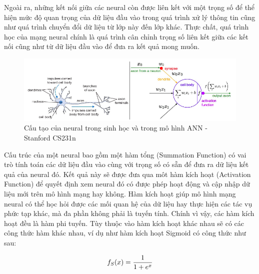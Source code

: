 Ngoài ra, những kết nối giữa các neural còn được liên kết với một trọng số để thể hiện mức độ quan trọng của dữ liệu đầu vào trong quá trình xử lý thông tin cũng như quá trình chuyển đổi dữ liệu từ lớp này đến lớp khác. Thực chất, quá trình học của mạng neural chính là quá trình cân chỉnh trọng số liên kết giữa các kết nối cũng như từ dữ liệu đầu vào để đưa ra kết quả mong muốn.

\begin{figure}[htbp]
    \centering
    \includegraphics[width=13cm]{Images/neural.png}
    \caption[Cấu tạo của neural trong sinh học và trong mô hình ANN]
    {Cấu tạo của neural trong sinh học và trong mô hình ANN - Stanford CS231n}
\end{figure}

Cấu trúc của một neural bao gồm một hàm tổng (Summation Function) có vai trò tính toán các dữ liệu đầu vào cùng với trọng số có sẵn để đưa ra dữ liệu kết quả của neural đó. Kết quả này sẽ được đưa qua môt hàm kích hoạt (Activation Function) để quyết định xem neural đó có được phép hoạt động và cập nhập dữ liệu mới trên mô hình mạng hay không. Hàm kích hoạt giúp mô hình mạng neural có thể học hỏi được các mối quan hệ của dữ liệu hay thực hiện các tác vụ phức tạp khác, mà đa phần không phải là tuyến tính. Chính vì vậy, các hàm kích hoạt đều là hàm phi tuyến. Tùy thuộc vào hàm kích hoạt khác nhau sẽ có các công thức hàm khác nhau, ví dụ như hàm kích hoạt Sigmoid có công thức như sau:

\begin{equation*}
f_{S}(x) = \frac{1}{1 + e^{x}}\\
\end{equation*}

